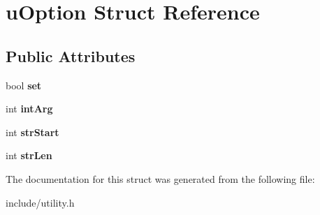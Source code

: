 \hypertarget{structuOption}{\section{u\-Option \-Struct \-Reference}
\label{d9/d8f/structuOption}
}
\subsection*{\-Public \-Attributes}
\begin{DoxyCompactItemize}
\item 
\hypertarget{structuOption_a28d94d0ef9a65e973764306f70f4ad64}{bool {\bfseries set}}\label{d9/d8f/structuOption_a28d94d0ef9a65e973764306f70f4ad64}

\item 
\hypertarget{structuOption_adb9c94e399edb1134a74fd36586d1530}{int {\bfseries int\-Arg}}\label{d9/d8f/structuOption_adb9c94e399edb1134a74fd36586d1530}

\item 
\hypertarget{structuOption_a3295bd87dfd6b701034c4f7689907024}{int {\bfseries str\-Start}}\label{d9/d8f/structuOption_a3295bd87dfd6b701034c4f7689907024}

\item 
\hypertarget{structuOption_a21ff6586bea56187617a8f63ad8167b8}{int {\bfseries str\-Len}}\label{d9/d8f/structuOption_a21ff6586bea56187617a8f63ad8167b8}

\end{DoxyCompactItemize}


\-The documentation for this struct was generated from the following file\-:\begin{DoxyCompactItemize}
\item 
include/utility.\-h\end{DoxyCompactItemize}
